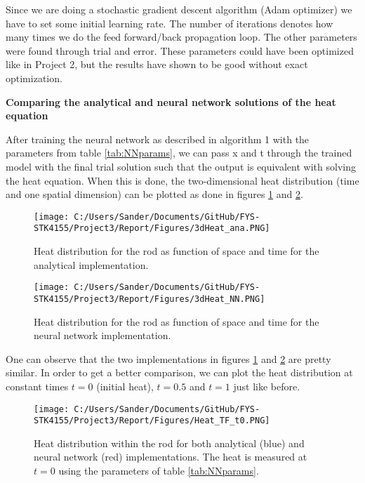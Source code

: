 \documentclass[12pt,a4paper]{article}
\begin{document}
\noindent Since we are doing a stochastic gradient descent algorithm (Adam optimizer) we have to set some initial learning rate. The number of iterations denotes how many times we do the feed forward/back propagation loop. The other parameters were found through trial and error. These parameters could have been optimized like in Project 2, but the results have shown to be good without exact optimization.

\begin{center}
\large{\textbf{Comparing the analytical and neural network solutions of the heat equation}}
\end{center}

\noindent After training the neural network as described in algorithm 1 with the parameters from table \ref{tab:NNparams}, we can pass x and t through the trained model with the final trial solution such that the output is equivalent with solving the heat equation. When this is done, the two-dimensional heat distribution (time and one spatial dimension) can be plotted as done in figures \ref{fig:3dHeatAna} and \ref{fig:3dHeatNN}.

\begin{figure}[H]
\centering
\texttt{[image: C:/Users/Sander/Documents/GitHub/FYS-STK4155/Project3/Report/Figures/3dHeat\_ana.PNG]}
\caption{\label{fig:3dHeatAna} Heat distribution for the rod as function of space and time for the analytical implementation.}
\end{figure}

\begin{figure}[H]
\centering
\texttt{[image: C:/Users/Sander/Documents/GitHub/FYS-STK4155/Project3/Report/Figures/3dHeat\_NN.PNG]}
\caption{\label{fig:3dHeatNN} Heat distribution for the rod as function of space and time for the neural network implementation.}
\end{figure}

\noindent One can observe that the two implementations in figures \ref{fig:3dHeatAna} and \ref{fig:3dHeatNN} are pretty similar. In order to get a better comparison, we can plot the heat distribution at constant times $t = 0$ (initial heat), $t = 0.5$ and $t = 1$ just like before.

\begin{figure}[H]
\centering
\texttt{[image: C:/Users/Sander/Documents/GitHub/FYS-STK4155/Project3/Report/Figures/Heat\_TF\_t0.PNG]}
\caption{\label{fig:rodHeatTF0} Heat distribution within the rod for both analytical (blue) and neural network (red) implementations. The heat is measured at $t = 0$ using the parameters of table \ref{tab:NNparams}.}
\end{figure}
\end{document}
